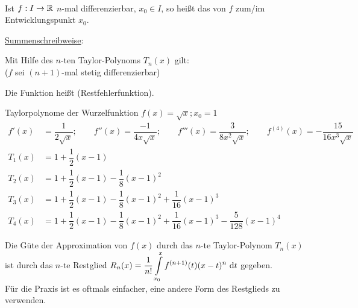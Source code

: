 \\
Ist $f:I\to\mathbb{R}$ $n$-mal differenzierbar, $x_0\in I$, so heißt
das  von $f$ zum/im Entwicklungspunkt $x_0$.

\ul{Summenschreibweise}:\\
\hhspace{2cm}

Mit Hilfe des $n$-ten Taylor-Polynoms $T_n(x)$ gilt:\\
\hhspace{2cm}\quad($f$ sei $(n+1)$-mal stetig differenzierbar)

Die Funktion
heißt  (Restfehlerfunktion).

\Bsp Taylorpolynome der Wurzelfunktion $f(x)=\sqrt{x};x_0=1$\\
\begin{align*}
f'(x)&=\dfrac{1}{2\sqrt{x}};\qquad f''(x)=\dfrac{-1}{4x\sqrt{x}};\qquad f'''(x)=\dfrac{3}{8x^2\sqrt{x}};\qquad f^{(4)}(x)=-\dfrac{15}{16x^3\sqrt{x}}\\
T_1(x)&=1+\dfrac{1}{2}(x-1)\\
T_2(x)&=1+\dfrac{1}{2}(x-1)-\dfrac{1}{8}(x-1)^2\\
T_3(x)&=1+\dfrac{1}{2}(x-1)-\dfrac{1}{8}(x-1)^2+\dfrac{1}{16}(x-1)^3\\
T_4(x)&=1+\dfrac{1}{2}(x-1)-\dfrac{1}{8}(x-1)^2+\dfrac{1}{16}(x-1)^3-\dfrac{5}{128}(x-1)^4
\end{align*}

\Bem Die Güte der Approximation von $f(x)$ durch das $n$-te Taylor-Polynom $T_n(x)$ ist durch das $n$-te Restglied $R_n(x)=\dfrac{1}{n!}\displaystyle\int\limits_{x_0}^{x}f^{(n+1)}(t)(x-t)^n\ \mathrm{d}t$ gegeben.\\
Für die Praxis ist es oftmals einfacher, eine andere Form des Restglieds zu verwenden.


